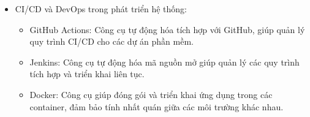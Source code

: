 \begin{itemize}
        \item[] CI/CD và DevOps trong phát triển hệ thống:
        \begin{itemize}
            \item GitHub Actions: Công cụ tự động hóa tích hợp với GitHub, giúp quản lý quy trình CI/CD cho các dự án phần mềm.
            \item Jenkins: Công cụ tự động hóa mã nguồn mở giúp quản lý các quy trình tích hợp và triển khai liên tục.
            \item Docker: Công cụ giúp đóng gói và triển khai ứng dụng trong các container, đảm bảo tính nhất quán giữa các môi trường khác nhau.
        \end{itemize}
    \end{itemize}
   